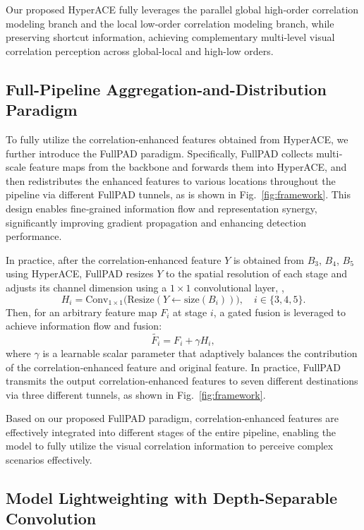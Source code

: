 Our proposed HyperACE fully leverages the parallel global high‑order correlation modeling branch and the local low‑order correlation modeling branch, while preserving shortcut information, achieving complementary multi‑level visual correlation perception across global-local and high-low orders.

\subsection{Full-Pipeline Aggregation-and-Distribution Paradigm}
\label{sec:fullpad}
To fully utilize the correlation-enhanced features obtained from HyperACE, we further introduce the FullPAD paradigm. Specifically, FullPAD collects multi‐scale feature maps from the backbone and forwards them into HyperACE, and then redistributes the enhanced features to various locations throughout the pipeline via different FullPAD tunnels, as is shown in Fig.~\ref{fig:framework}. This design enables fine‐grained information flow and representation synergy, significantly improving gradient propagation and enhancing detection performance.

In practice, after the correlation-enhanced feature $Y$ is obtained from $B_3$, $B_4$, $B_5$ using HyperACE, FullPAD resizes $Y$ to the spatial resolution of each stage and adjusts its channel dimension using a \(1\times1\) convolutional layer, \ie, 
\begin{equation}
    H_i = \text{Conv}_{1\times1}\bigl(\text{Resize}(Y \leftarrow \mathrm{size}(B_i))\bigr),
\quad i \in \{3,4,5\}.
\end{equation}
Then, for an arbitrary feature map \(F_i\) at stage \(i\), a gated fusion is leveraged to achieve information flow and fusion:
\begin{equation}
    \widetilde{F_i}= F_i+\gamma H_i,
\end{equation}
where \(\gamma\) is a learnable scalar parameter that adaptively balances the contribution of the correlation‐enhanced feature and original feature. In practice, FullPAD transmits the output correlation-enhanced features to seven different destinations via three different tunnels, as shown in Fig.~\ref{fig:framework}.

Based on our proposed FullPAD paradigm, correlation-enhanced features are effectively integrated into different stages of the entire pipeline, enabling the model to fully utilize the visual correlation information to perceive complex scenarios effectively.


\subsection{Model Lightweighting with Depth-Separable Convolution}
\label{sec:dsc3k}

